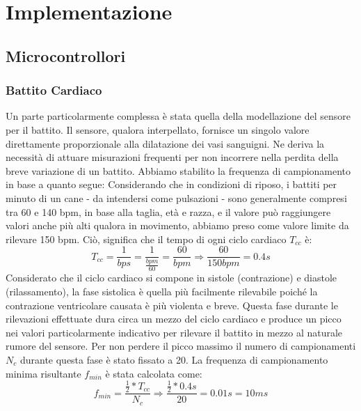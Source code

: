 

\chapter{Implementazione}
\section{Microcontrollori}
\subsection{Battito Cardiaco}
Un parte particolarmente complessa è stata quella della modellazione del sensore per il battito. Il sensore, qualora interpellato, fornisce un singolo valore direttamente proporzionale alla dilatazione dei vasi sanguigni. Ne deriva la necessità di attuare misurazioni frequenti per non incorrere nella perdita della breve variazione di un battito. Abbiamo stabilito la frequenza di campionamento in base a quanto segue:
Considerando che in condizioni di riposo, i battiti per minuto di un cane - da intendersi come pulsazioni - sono generalmente compresi tra 60 e 140 bpm, in base alla taglia, età e razza, e il valore può raggiungere valori anche più alti qualora in movimento, abbiamo preso come valore limite da rilevare 150 bpm. Ciò, significa che il tempo di ogni ciclo cardiaco $T_{cc}$ è:
\begin{equation}
T_{cc} = \frac{1}{bps} = \frac{1}{\frac{bpm}{60}}= \frac{60}{bpm} \Rightarrow \frac{60}{150 bpm} = 0.4s
\end{equation}
Considerato che il ciclo cardiaco si compone in sistole (contrazione) e diastole (rilassamento), la fase sistolica è quella più facilmente rilevabile poiché la contrazione ventricolare causata è più violenta e breve. Questa fase durante le rilevazioni effettuate dura circa un mezzo del ciclo cardiaco e produce un picco nei valori particolarmente indicativo per rilevare il battito in mezzo al naturale rumore del sensore. Per non perdere il picco massimo il numero di campionamenti $N_{c}$ durante questa fase è stato fissato a 20. La frequenza di campionamento minima risultante $f_{min}$ è stata calcolata come: 
\begin{equation}
f_{min} = \frac{ \frac{1}{2} *  T_{cc} }{N_{c}} \Rightarrow  \frac{ \frac{1}{2} *  0.4s }{20} = 0.01s = 10 ms 
\end{equation}

